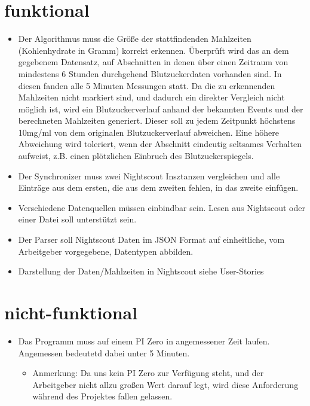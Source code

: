 \documentclass[accentcolor=tud0b,12pt,paper=a4]{tudreport}
\begin{document}
	\section{funktional}
\begin{itemize}
	\item Der Algorithmus muss die Größe der stattfindenden Mahlzeiten (Kohlenhydrate in Gramm) korrekt erkennen. 
	 Überprüft wird das an dem gegebenem Datensatz, auf Abschnitten in denen über einen Zeitraum von mindestens 6 Stunden durchgehend Blutzuckerdaten vorhanden sind. In diesen fanden alle 5 Minuten Messungen statt. Da die zu erkennenden Mahlzeiten nicht markiert sind, und dadurch ein direkter Vergleich nicht möglich ist, wird ein Blutzuckerverlauf anhand der bekannten Events und der berechneten Mahlzeiten generiert. Dieser soll zu jedem Zeitpunkt höchstens 10mg/ml von dem originalen Blutzuckerverlauf abweichen. Eine höhere Abweichung wird toleriert, wenn der Abschnitt eindeutig seltsames Verhalten aufweist, z.B. einen plötzlichen Einbruch des Blutzuckerspiegels.
	
\item Der Synchronizer muss zwei Nightscout Insztanzen vergleichen und alle Einträge aus dem ersten, die aus dem zweiten fehlen, in das zweite einfügen.

\item Verschiedene Datenquellen müssen einbindbar sein. Lesen aus Nightscout oder einer Datei soll unterstützt sein.

\item Der Parser soll Nightscout Daten im JSON Format auf einheitliche, vom Arbeitgeber vorgegebene, Datentypen abbilden.



\item Darstellung der Daten/Mahlzeiten in Nightscout siehe User-Stories

\end{itemize}

	
	\section{nicht-funktional}
\begin{itemize}
	\item Das Programm muss auf einem PI Zero in angemessener Zeit laufen. Angemessen bedeutetd dabei unter 5 Minuten. 
	\begin{itemize}
	\item Anmerkung: Da uns kein PI Zero zur Verfügung steht, und der Arbeitgeber nicht allzu großen Wert darauf legt, wird diese Anforderung während des Projektes fallen gelassen. 
	\end{itemize}
	
\end{itemize}
\end{document}

